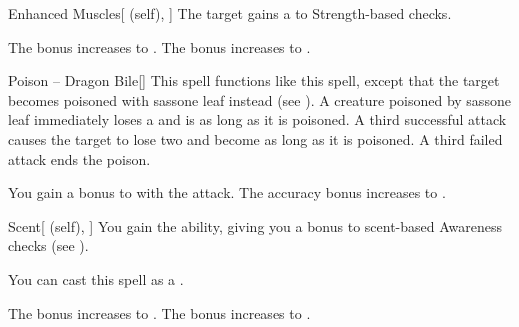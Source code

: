 \lowercase{\hypertarget{spell:Enhanced Muscles}{}}\label{spell:Enhanced Muscles}
\begin{attuneability}[Rank 3]{\hypertarget{spell:Enhanced Muscles}{Enhanced Muscles}}[ (self), ]
The target gains a   to Strength-based checks.

\rankline
{} The bonus increases to .
 The bonus increases to .

\end{attuneability}
\vspace{0.25em}



\lowercase{\hypertarget{spell:Poison -- Dragon Bile}{}}\label{spell:Poison -- Dragon Bile}
\begin{freeability}[Rank 3]{\hypertarget{spell:Poison -- Dragon Bile}{Poison -- Dragon Bile}}[]
This spell functions like this  spell, except that the target becomes poisoned with sassone leaf instead (see ).
A creature poisoned by sassone leaf immediately loses a  and is  as long as it is poisoned.
A third successful attack causes the target to lose two  and become  as long as it is poisoned.
A third failed attack ends the poison.

\rankline
{} You gain a  bonus to  with the attack.
 The accuracy bonus increases to .

\end{freeability}
\vspace{0.25em}



\lowercase{\hypertarget{spell:Scent}{}}\label{spell:Scent}
\begin{attuneability}[Rank 3]{\hypertarget{spell:Scent}{Scent}}[ (self), ]
You gain the  ability, giving you a  bonus to scent-based Awareness checks (see ).

You can cast this spell as a .

\rankline
{} The bonus increases to .
 The bonus increases to .

\end{attuneability}
\vspace{0.25em}



